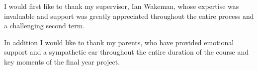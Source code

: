 
\begin{acknowledgements}

I would first like to thank my supervisor, Ian Wakeman, whose expertise was invaluable and support was greatly appreciated throughout the entire process and a challenging second term. \newline \par

In addition I would like to thank my parents, who have provided emotional support and a sympathetic ear throughout the entire duration of the course and key moments of the final year project.

\end{acknowledgements}